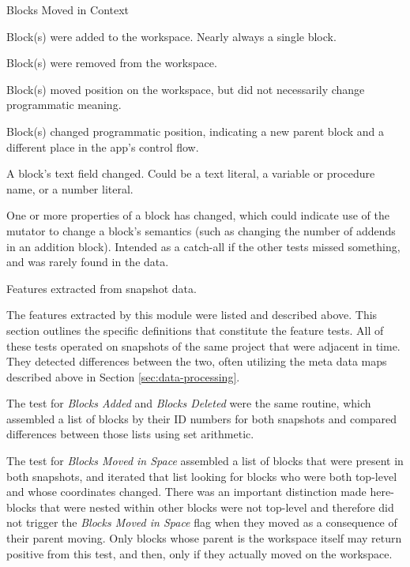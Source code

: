 \begin{table}
\begin{labeling}{Blocks Moved in Context}

	\item [Blocks Added] Block(s) were added to the workspace. Nearly always a single block.
	\item [Blocks Deleted] Block(s) were removed from the workspace.
	\item [Blocks Moved in Space] Block(s) moved position on the workspace, but did not necessarily change programmatic meaning.
	\item [Blocks Moved in Context] Block(s) changed programmatic position, indicating a new parent block and a different place in the app's control flow.
	\item [Fields Changed] A block's text field changed. Could be a text literal, a variable or procedure name, or a number literal.
	\item [Properties Modified] One or more properties of a block has changed, which could indicate use of the mutator to change a block's semantics (such as changing the number of addends in an addition block). Intended as a catch-all if the other tests missed something, and was rarely found in the data.
	
\end{labeling}
\caption[Features extracted from snapshots]{Features extracted from snapshot data.}
\label{tab:features-extracted}
\end{table}

The features extracted by this module were listed and described above. %
This section outlines the specific definitions that constitute the feature tests. All of these tests operated on snapshots of the same project that were adjacent in time. 
They detected differences between the two, often utilizing the meta data maps described above in Section \ref{sec:data-processing}. 

The test for \emph{Blocks Added} and \emph{Blocks Deleted} were the same routine, which assembled a list of blocks by their ID numbers for both snapshots and compared differences between those lists using set arithmetic. 

The test for \emph{Blocks Moved in Space} assembled a list of blocks that were present in both snapshots, and iterated that list looking for blocks who were both top-level and whose coordinates changed. There was an important distinction made here- blocks that were nested within other blocks were not top-level and therefore did not trigger the \emph{Blocks Moved in Space} flag when they moved as a consequence of their parent moving. Only blocks whose parent is the workspace itself may return positive from this test, and then, only if they actually moved on the workspace.

